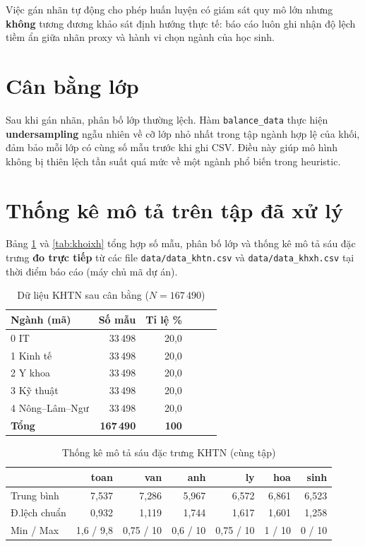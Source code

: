 Việc gán nhãn tự động cho phép huấn luyện có giám sát quy mô lớn nhưng \textbf{không} tương đương khảo sát định hướng thực tế: báo cáo luôn ghi nhận độ lệch tiềm ẩn giữa nhãn proxy và hành vi chọn ngành của học sinh.

\section{Cân bằng lớp}
Sau khi gán nhãn, phân bố lớp thường lệch. Hàm \texttt{balance\_data} thực hiện \textbf{undersampling} ngẫu nhiên về cỡ lớp nhỏ nhất trong tập ngành hợp lệ của khối, đảm bảo mỗi lớp có cùng số mẫu trước khi ghi CSV. Điều này giúp mô hình không bị thiên lệch tần suất quá mức về một ngành phổ biến trong heuristic.

\section{Thống kê mô tả trên tập đã xử lý}
Bảng \ref{tab:khoin} và \ref{tab:khoixh} tổng hợp số mẫu, phân bố lớp và thống kê mô tả sáu đặc trưng \textbf{đo trực tiếp} từ các file \texttt{data/data\_khtn.csv} và \texttt{data/data\_khxh.csv} tại thời điểm báo cáo (máy chủ mã dự án).

\begin{table}[htbp]
\centering
\caption{Dữ liệu KHTN sau cân bằng ($N=167\,490$)}
\label{tab:khoin}
\begin{tabular}{lrrrrr}
\toprule
Ngành (mã) & Số mẫu & Tỉ lệ \% \\
\midrule
0 IT & 33\,498 & 20{,}0 \\
1 Kinh tế & 33\,498 & 20{,}0 \\
2 Y khoa & 33\,498 & 20{,}0 \\
3 Kỹ thuật & 33\,498 & 20{,}0 \\
4 Nông--Lâm--Ngư & 33\,498 & 20{,}0 \\
\midrule
\textbf{Tổng} & \textbf{167\,490} & \textbf{100} \\
\bottomrule
\end{tabular}
\end{table}

\begin{table}[htbp]
\centering
\caption{Thống kê mô tả sáu đặc trưng KHTN (cùng tập)}
\begin{tabular}{lrrrrrr}
\toprule
 & toan & van & anh & ly & hoa & sinh \\
\midrule
Trung bình & 7{,}537 & 7{,}286 & 5{,}967 & 6{,}572 & 6{,}861 & 6{,}523 \\
Đ.lệch chuẩn & 0{,}932 & 1{,}119 & 1{,}744 & 1{,}617 & 1{,}601 & 1{,}258 \\
Min / Max & 1{,}6 / 9{,}8 & 0{,}75 / 10 & 0{,}6 / 10 & 0{,}75 / 10 & 1 / 10 & 0 / 10 \\
\bottomrule
\end{tabular}
\end{table}

